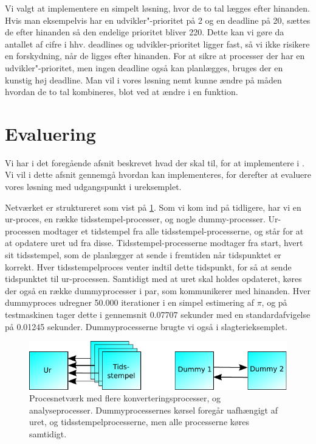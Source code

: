 Vi valgt at implementere en simpelt løsning, hvor  de to tal lægges efter hinanden. Hvis man eksempelvis har en udvikler"-prioritet på 2 og en deadline på 20, sættes de efter hinanden så den endelige prioritet bliver 220. Dette kan vi gøre da antallet af cifre i hhv. deadlines og udvikler-prioritet ligger fast, så vi ikke risikere en forskydning, når de ligges efter hinanden. For at sikre at processer der har en udvikler"-prioritet, men ingen deadline også kan planlægges, bruges der en kunstig høj deadline. Man vil i vores løsning nemt kunne ændre på måden hvordan de to tal kombineres, blot ved at ændre i en funktion. 




    
\section{Evaluering}
Vi har i det foregående afsnit beskrevet hvad der skal til, for at implementere \is i \pycsp. Vi vil i dette afsnit gennemgå hvordan \is kan implementeres, for derefter at evaluere vores løsning med udgangspunkt i ureksemplet.

Netværket er struktureret som vist på \cref{fig:watch_network}. Som vi kom ind på tidligere, har vi en ur-proces, en række tidsstempel-processer, og nogle dummy-processer. Ur-processen modtager et tidstempel fra alle  tidsstempel-processerne, og står for at at opdatere uret ud fra disse. Tidsstempel-processerne modtager fra start, hvert sit tidsstempel, som de planlægger at sende i fremtiden når tidspunktet er korrekt. Hver tidsstempelproces  venter indtil dette tidspunkt, for så at sende tidspunktet til ur-processen. Samtidigt med at uret skal holdes opdateret, køres der også en række dummyprocesser i par, som kommunikerer med hinanden. Hver dummyproces udregner 50.000 iterationer i en simpel estimering af $\pi$, og på testmaskinen tager dette i gennemsnit 0.07707 sekunder med en standardafvigelse på 0.01245 sekunder. Dummyprocesserne brugte vi også i slagterieksemplet.
\begin{figure}
 \begin{center}
  \includegraphics[scale=1]{images/watch-network}
	\caption{Procesnetværk med flere konverteringsprocesser, og analyseprocesser. Dummyprocessernes kørsel foregår uafhængigt af uret, og tidsstempelprocesserne, men alle processerne køres samtidigt.}
	\label{fig:watch_network}
\end{center}
\end{figure}

